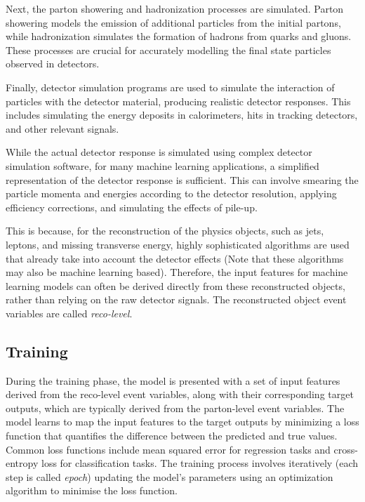 Next, the parton showering and hadronization processes are simulated. Parton showering models the emission of additional particles from the initial partons, while hadronization simulates the formation of hadrons from quarks and gluons. These processes are crucial for accurately modelling the final state particles observed in detectors.

Finally, detector simulation programs are used to simulate the interaction of particles with the detector material, producing realistic detector responses. This includes simulating the energy deposits in calorimeters, hits in tracking detectors, and other relevant signals.

While the actual detector response is simulated using complex detector simulation software, for many machine learning applications, a simplified representation of the detector response is sufficient. This can involve smearing the particle momenta and energies according to the detector resolution, applying efficiency corrections, and simulating the effects of pile-up.

This is because, for the reconstruction of the physics objects, such as jets, leptons, and missing transverse energy, highly sophisticated algorithms are used that already take into account the detector effects (Note that these algorithms may also be machine learning based). Therefore, the input features for machine learning models can often be derived directly from these reconstructed objects, rather than relying on the raw detector signals. The reconstructed object event variables are called \textit{reco-level}.

\subsection{Training}
During the training phase, the model is presented with a set of input features derived from the reco-level event variables, along with their corresponding target outputs, which are typically derived from the parton-level event variables. The model learns to map the input features to the target outputs by minimizing a loss function that quantifies the difference between the predicted and true values. Common loss functions include mean squared error for regression tasks and cross-entropy loss \cite{cross-entropy} for classification tasks.
The training process involves iteratively (each step is called \textit{epoch}) updating the model's parameters using an optimization algorithm to minimise the loss function.

